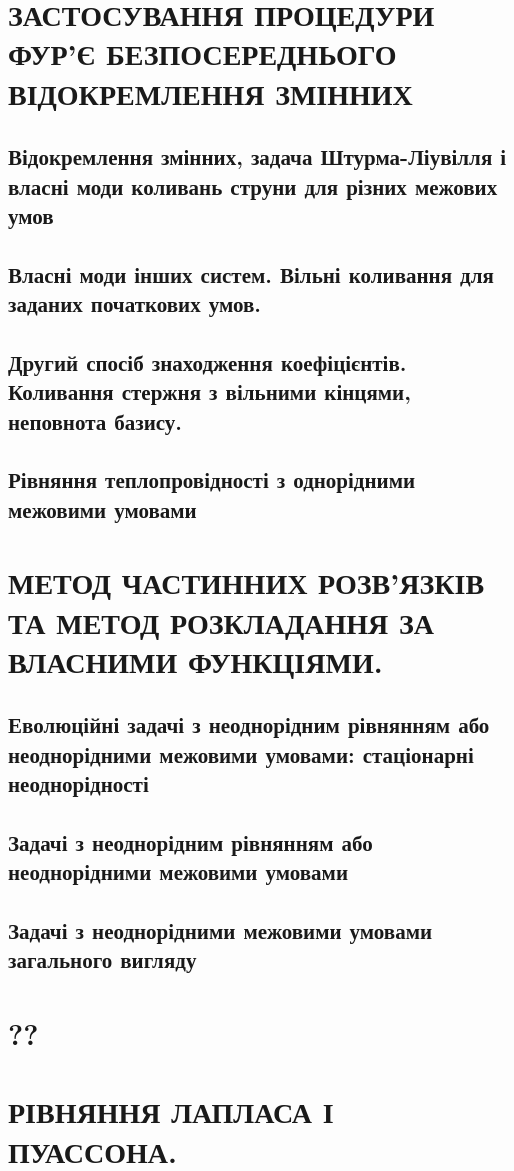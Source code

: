 \documentclass[a4paper, 14pt]{extreport}
\begin{document}
\tableofcontents
\setcounter{page}{2}

\part{ЗАСТОСУВАННЯ ПРОЦЕДУРИ ФУР’Є БЕЗПОСЕРЕДНЬОГО ВІДОКРЕМЛЕННЯ ЗМІННИХ}

\chapter{Відокремлення змінних, задача Штурма-Ліувілля і власні моди коливань струни для різних межових умов}


\chapter{Власні моди інших систем. Вільні коливання для заданих початкових умов.}

\vspace{2cm}


\chapter{Другий спосіб знаходження коефіцієнтів. Коливання стержня з вільними кінцями, неповнота базису.}



\chapter{Рівняння теплопровідності з однорідними межовими умовами}

\vspace{2cm}



\part{МЕТОД ЧАСТИННИХ РОЗВ’ЯЗКІВ ТА МЕТОД РОЗКЛАДАННЯ ЗА ВЛАСНИМИ ФУНКЦІЯМИ.}

\chapter{Еволюційні задачі з неоднорідним рівнянням або неоднорідними межовими умовами: стаціонарні неоднорідності}



\chapter{Задачі з неоднорідним рівнянням або неоднорідними межовими умовами}

\vspace{2cm}


\chapter{Задачі з неоднорідними межовими умовами загального вигляду}




\part{??}

\part{РІВНЯННЯ ЛАПЛАСА І ПУАССОНА.}
\end{document}
